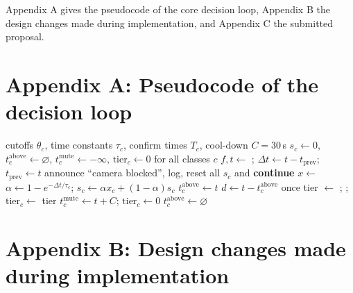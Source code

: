 Appendix A gives the pseudocode of the core decision loop, Appendix B the design changes made during implementation, and Appendix C the submitted proposal.

\section*{Appendix A: Pseudocode of the decision loop}

\begin{algorithm}[htbp]
\caption{Per-frame filtering and alert decision}
\label{alg:decision}
\small
\begin{algorithmic}[1]
\Require cutoffs $\theta_c$, time constants $\tau_c$, confirm times $T_c$, cool-down $C=30$\,s
\State $s_c \gets 0$, $t^{\text{above}}_c \gets \varnothing$, $t^{\text{mute}}_c \gets -\infty$, $\text{tier}_c \gets 0$ for all classes $c$
  \State $f, t \gets$ ; $\Delta t \gets t - t_\text{prev}$; $t_\text{prev} \gets t$
    \State announce ``camera blocked'', log, reset all $s_c$ and \textbf{continue}
  \EndIf
  \State $x \gets$  
    \State $\alpha \gets 1 - e^{-\Delta t / \tau_c}$; \quad $s_c \gets \alpha x_c + (1-\alpha) s_c$
       $t^{\text{above}}_c \gets t$ \EndIf
      \State $d \gets t - t^{\text{above}}_c$
        \State {} once 
        \State tier $\gets$  
          \State {}; ; $\text{tier}_c \gets$ tier
        \EndIf
      \EndIf
    \Else
       $t^{\text{mute}}_c \gets t + C$; $\text{tier}_c \gets 0$ \EndIf {}
      \State $t^{\text{above}}_c \gets \varnothing$
    \EndIf
  \EndFor
\EndWhile
\end{algorithmic}
\end{algorithm}


\clearpage
\clearpage
\section*{Appendix B: Design changes made during implementation}

